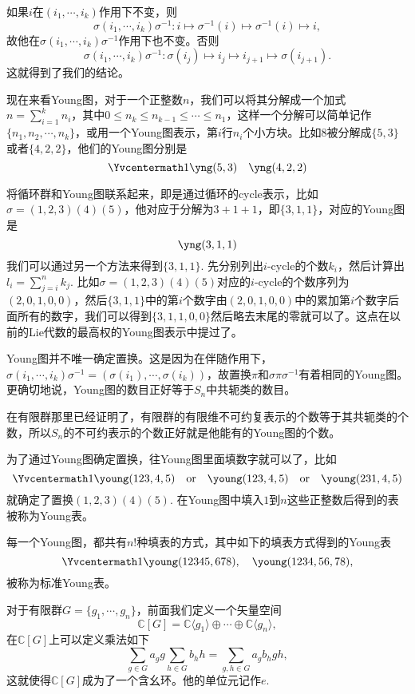 \documentclass[11pt]{article}
\theoremstyle{definition}
\theoremstyle{plain}
\newcommand{\cc}{\mathbb{C}}
\begin{document}
\proof 如果$i$在$(i_1,\cdots,i_k)$作用下不变，则
\[\sigma (i_1,\cdots,i_k)\sigma^{-1}:i\mapsto \sigma^{-1}(i)\mapsto \sigma^{-1}(i) \mapsto i,\]
故他在$\sigma (i_1,\cdots,i_k)\sigma^{-1}$作用下也不变。否则
\[
	\sigma (i_1,\cdots,i_k)\sigma^{-1}:\sigma(i_j)\mapsto i_j\mapsto i_{j+1} \mapsto \sigma(i_{j+1}).
\]
这就得到了我们的结论。\endproof

\para 现在来看Young图，对于一个正整数$n$，我们可以将其分解成一个加式$n=\sum_{i=1}^k n_i$，其中$0\leq n_k\leq n_{k-1}\leq \cdots \leq n_1$，这样一个分解可以简单记作$\{n_1,n_2,\cdots,n_k\}$，或用一个Young图表示，第$i$行$n_i$个小方块。比如$8$被分解成$\{5,3\}$或者$\{4,2,2\}$，他们的Young图分别是
\[\Yvcentermath1
	\yng(5,3)\quad \yng(4,2,2)
\]

将循环群和Young图联系起来，即是通过循环的cycle表示，比如$\sigma=(1,2,3)(4)(5)$，他对应于分解为$3+1+1$，即$\{3,1,1\}$，对应的Young图是
\[
	\yng(3,1,1)
\]
我们可以通过另一个方法来得到$\{3,1,1\}$. 先分别列出$i$-cycle的个数$k_i$，然后计算出$l_i=\sum_{j=i}^nk_j$. 比如$\sigma=(1,2,3)(4)(5)$对应的$i$-cycle的个数序列为$(2,0,1,0,0)$，然后$\{3,1,1\}$中的第$i$个数字由$(2,0,1,0,0)$中的累加第$i$个数字后面所有的数字，我们可以得到$\{3,1,1,0,0\}$然后略去末尾的零就可以了。这点在以前的Lie代数的最高权的Young图表示中提过了。

Young图并不唯一确定置换。这是因为在伴随作用下，$\sigma (i_1,\cdots,i_k)\sigma^{-1}= (\sigma(i_1),\cdots,\sigma(i_k))$，故置换$\pi$和$\sigma\pi\sigma^{-1}$有着相同的Young图。更确切地说，Young图的数目正好等于$S_n$中共轭类的数目。

在有限群那里已经证明了，有限群的有限维不可约复表示的个数等于其共轭类的个数，所以$S_n$的不可约表示的个数正好就是他能有的Young图的个数。

\para 为了通过Young图确定置换，往Young图里面填数字就可以了，比如
\[\Yvcentermath1
	\young(123,4,5)\quad \text{or}\quad \young(123,4,5)\quad \text{or}\quad \young(231,4,5)
\]
就确定了置换$(1,2,3)(4)(5)$. 在Young图中填入$1$到$n$这些正整数后得到的表被称为Young表。

每一个Young图，都共有$n!$种填表的方式，其中如下的填表方式得到的Young表
\[\Yvcentermath1
	\young(12345,678),\quad \young(1234,56,78),
\]
被称为标准Young表。

\para 对于有限群$G=\{g_1,\cdots,g_n\}$，前面我们定义一个矢量空间
\[
	\cc [G]=\cc\langle g_1\rangle \oplus \cdots \oplus \cc\langle g_n\rangle,
\]
在$\cc [G]$上可以定义乘法如下
\[
	\sum_{g\in G} a_g g \sum_{h\in G} b_h h=\sum_{g,h\in G}a_gb_h gh,
\]
这就使得$\cc [G]$成为了一个含幺环。他的单位元记作$e$.
\end{document}
